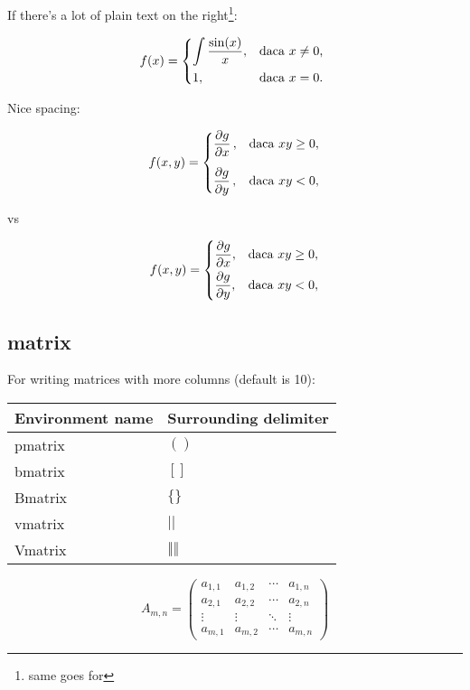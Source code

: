 If there's a lot of plain text on the right\footnote{same goes for }:\\
\begin{example}
\[f(x) =
  \begin{dcases*}
    \int \frac{\sin(x)}{x},&daca $x \neq 0$,\\
    1,& daca $x=0$.
  \end{dcases*}
\]
\end{example}


\newcommand{\parti}[2]{\frac{\partial #1}{\partial #2}}
Nice spacing:\\
\begin{example}
\[f(x, y) =
\begin{dcases}
  \parti{g}{x}\,,&\text{daca } x y \geq 0,\\[0.5em]
  \parti{g}{y}\,,&\text{daca } x y < 0,
\end{dcases}
\]
\end{example}

vs\\
\begin{example}
\[f(x, y) =
\begin{dcases}
 \parti{g}{x},&\text{daca } x y \geq 0,\\
 \parti{g}{y},&\text{daca } x y < 0,
\end{dcases}
\]
\end{example}



\subsection{matrix}
For writing matrices with more columns (default is 10):
\code{\setcounter{MaxMatrixCols}{15}}

\begin{tabular}{|l|l|}
  \hline
  Environment name & Surrounding delimiter\\
  \hline
pmatrix & $( )$\\
bmatrix & $[ ]$\\
Bmatrix & $\{ \}$\\
vmatrix & $| |$\\
Vmatrix & $\Vert \Vert$\\
  \hline
\end{tabular}

\begin{example}
\[
A_{m,n} = 
 \begin{pmatrix}
  a_{1,1} & a_{1,2} & \cdots & a_{1,n} \\
  a_{2,1} & a_{2,2} & \cdots & a_{2,n} \\
  \vdots  & \vdots  & \ddots & \vdots  \\
  a_{m,1} & a_{m,2} & \cdots & a_{m,n} 
\end{pmatrix}
\]
\end{example}

